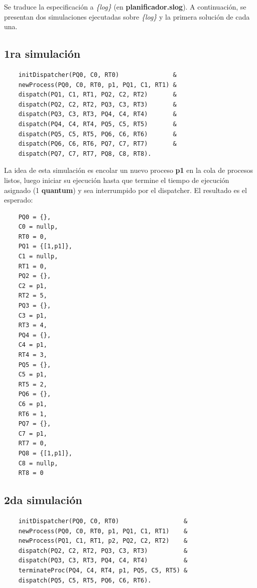\documentclass{article}
\begin{document}
Se traduce la especificación a \textit{\{log\}} (en \textbf{planificador.slog}). A continuación, se presentan dos simulaciones ejecutadas sobre \textit{\{log\}} y la primera solución de cada una.


\subsection*{1ra simulación}

\begin{verbatim}
    initDispatcher(PQ0, C0, RT0)               & 
    newProcess(PQ0, C0, RT0, p1, PQ1, C1, RT1) & 
    dispatch(PQ1, C1, RT1, PQ2, C2, RT2)       &
    dispatch(PQ2, C2, RT2, PQ3, C3, RT3)       &
    dispatch(PQ3, C3, RT3, PQ4, C4, RT4)       &
    dispatch(PQ4, C4, RT4, PQ5, C5, RT5)       &
    dispatch(PQ5, C5, RT5, PQ6, C6, RT6)       &
    dispatch(PQ6, C6, RT6, PQ7, C7, RT7)       &
    dispatch(PQ7, C7, RT7, PQ8, C8, RT8). 
\end{verbatim}

La idea de esta simulación es encolar un nuevo proceso \textbf{p1} en la cola de procesos listos, luego iniciar su ejecución hasta que termine el tiempo de ejecución asignado (1 \textbf{quantum}) y sea interrumpido por el dispatcher. El resultado es el esperado:

\begin{verbatim}
    PQ0 = {},  
    C0 = nullp,  
    RT0 = 0,  
    PQ1 = {[1,p1]},  
    C1 = nullp,  
    RT1 = 0,  
    PQ2 = {},  
    C2 = p1,  
    RT2 = 5,  
    PQ3 = {},  
    C3 = p1,  
    RT3 = 4,  
    PQ4 = {},  
    C4 = p1,  
    RT4 = 3,  
    PQ5 = {},  
    C5 = p1,  
    RT5 = 2,  
    PQ6 = {},  
    C6 = p1,  
    RT6 = 1,  
    PQ7 = {},  
    C7 = p1,  
    RT7 = 0,  
    PQ8 = {[1,p1]},  
    C8 = nullp,  
    RT8 = 0
\end{verbatim}


\subsection*{2da simulación}

\begin{verbatim}
    initDispatcher(PQ0, C0, RT0)                  & 
    newProcess(PQ0, C0, RT0, p1, PQ1, C1, RT1)    & 
    newProcess(PQ1, C1, RT1, p2, PQ2, C2, RT2)    & 
    dispatch(PQ2, C2, RT2, PQ3, C3, RT3)          &  
    dispatch(PQ3, C3, RT3, PQ4, C4, RT4)          & 
    terminateProc(PQ4, C4, RT4, p1, PQ5, C5, RT5) & 
    dispatch(PQ5, C5, RT5, PQ6, C6, RT6). 
\end{verbatim}
\end{document}
